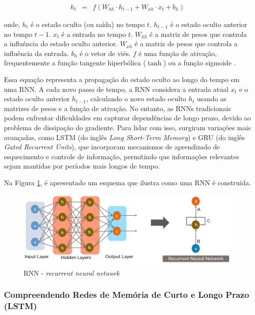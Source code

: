 \begin{eqnarray}
	h_t &=& f(W_{hh} \cdot h_{t-1} + W_{xh} \cdot x_t + b_h)
\end{eqnarray}

\noindent onde, \( h_t \) é o estado oculto (ou saída) no tempo \( t \). \( h_{t-1} \) é o estado oculto anterior no tempo \( t-1 \). \( x_t \) é a entrada no tempo \( t \). \( W_{hh} \) é a matriz de pesos que controla a influência do estado oculto anterior. \( W_{xh} \) é a matriz de pesos que controla a influência da entrada. \( b_h \) é o vetor de viés. \( f \) é uma função de ativação, frequentemente a função tangente hiperbólica ($\operatorname{tanh}$) ou a função sigmoide \cite{lstm}.


Essa equação representa a propagação do estado oculto ao longo do tempo em uma RNN. A cada novo passo de tempo, a RNN considera a entrada atual \( x_t \) e o estado oculto anterior \( h_{t-1} \), calculando o novo estado oculto \( h_t \) usando as matrizes de pesos e a função de ativação.
No entanto, as RNNs tradicionais podem enfrentar dificuldades em capturar dependências de longo prazo, devido ao problema de dissipação do gradiente. Para lidar com isso, surgiram variações mais avançadas, como LSTM (do inglês \textit{Long Short-Term Memory})  e GRU (do inglês \textit{Gated Recurrent Units}), que incorporam mecanismos de aprendizado de esquecimento e controle de informação, permitindo que informações relevantes sejam mantidas por períodos mais longos de tempo.

Na Figura \ref{fig:8s40xcsn}, é apresentado um esquema que ilustra como uma RNN é construída.

\begin{figure}[H]
	\centering
	\caption{RNN - \textit{recurrent neural network}}
	\label{fig:8s40xcsn}
	\includegraphics[width=1\linewidth]{Apendices/Figuras/modelagem-24h/8s40xcsn}
	
\end{figure}

\subsubsection{Compreendendo Redes de Mem\'oria de Curto e Longo Prazo (LSTM)}

